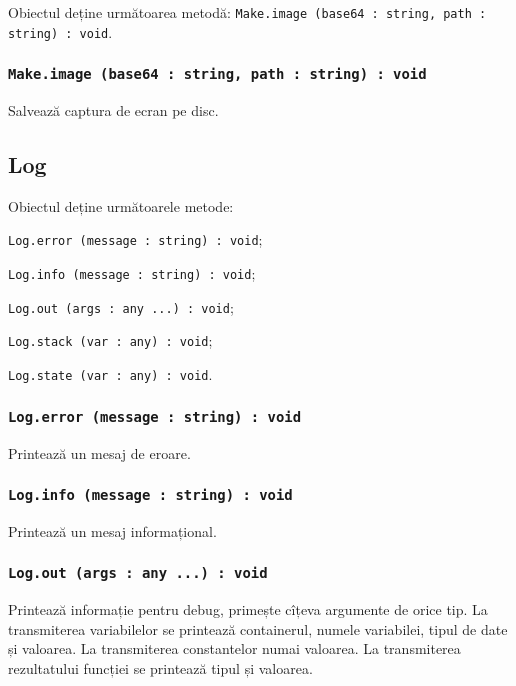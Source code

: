 Obiectul \make{} deține următoarea metodă: \lstinline|Make.image (base64 : string, path : string) : void|.

\subsubsection{\lstinline|Make.image (base64 : string, path : string) : void|}

Salvează captura de ecran pe disc.

\subsection{{\color{orange} Log}}

Obiectul \logtype{} deține următoarele metode:
\begin{icItems}
	\item \lstinline|Log.error (message : string) : void|;
	\item \lstinline|Log.info (message : string) : void|;
	\item \lstinline|Log.out (args : any ...) : void|;
	\item \lstinline|Log.stack (var : any) : void|;
	\item \lstinline|Log.state (var : any) : void|.
\end{icItems}

\subsubsection{\lstinline|Log.error (message : string) : void|}

Printează un mesaj de eroare.

\subsubsection{\lstinline|Log.info (message : string) : void|}

Printează un mesaj informațional.

\subsubsection{\lstinline|Log.out (args : any ...) : void|}

Printează informație pentru debug, primește cîțeva argumente de orice tip. La transmiterea variabilelor se printează containerul, numele variabilei, tipul de date și valoarea. La transmiterea constantelor numai valoarea. La transmiterea rezultatului funcției se printează tipul și valoarea.

